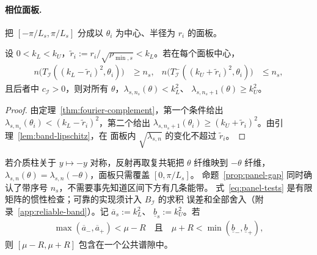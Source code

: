 \paragraph{相位面板.}
把 $[-\pi/L_s,\pi/L_s]$ 分成以 $\theta_i$ 为中心、半径为 $r_i$ 的面板。

\begin{proposition}[面板上的谱隙判据]
  \label{prop:panel-gap}
  设 $0<k_L<k_U$，$\tilde r_i:=r_i/\sqrt{\rho_{\min,s}}<k_L$。若在每个面板中心，
  \begin{align}
    n\bigl(T_{\mathcal I}((k_L-\tilde r_i)^2,\theta_i)\bigr)&\geq n_s,
    &n\bigl(T^-_{\mathcal I}((k_U+\tilde r_i)^2,\theta_i)\bigr)&\leq n_s,
    \label{eq:panel-tests}
  \end{align}
  且后者中 $c_{\mathcal I}>0$，则对所有 $\theta$，$\lambda_{s,n_s}(\theta)<k_L^2$、
  $\lambda_{s,n_s+1}(\theta)\geq k_U^2$。
\end{proposition}

\begin{proof}
  由定理~\ref{thm:fourier-complement}，第一个条件给出
  $\lambda_{s,n_s}(\theta_i)<(k_L-\tilde r_i)^2$，第二个给出
  $\lambda_{s,n_s+1}(\theta_i)\geq(k_U+\tilde r_i)^2$。由引理~\ref{lem:band-lipschitz}，在
  面板内 $\sqrt{\lambda_{s,n}}$ 的变化不超过 $\tilde r_i$。
\end{proof}

若介质柱关于 $y\mapsto-y$ 对称，反射再取复共轭把 $\theta$ 纤维映到 $-\theta$ 纤维，
$\lambda_{s,n}(\theta)=\lambda_{s,n}(-\theta)$，面板只需覆盖 $[0,\pi/L_s]$。
命题~\ref{prop:panel-gap} 同时确认了带序号 $n_s$，不需要事先知道区间下方有几条能带。
式~\eqref{eq:panel-tests} 是有限矩阵的惯性检查；可靠的实现须计入 $B_{\mathcal I}$ 的求积
误差和全部舍入（附录~\ref{app:reliable-band}）。记 $\overline a_s:=k_L^2$、
$\underline b_s:=k_U^2$。若
\begin{align}
  \max(\overline a_-,\overline a_+)<\mu-R\quad\text{且}\quad
  \mu+R<\min(\underline b_-,\underline b_+),
  \label{eq:gap-condition}
\end{align}
则 $[\mu-R,\mu+R]$ 包含在一个公共谱隙中。
